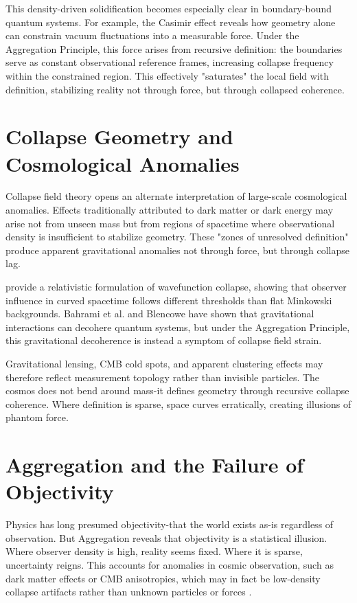 This density-driven solidification becomes especially clear in boundary-bound quantum systems. For example, the Casimir effect reveals how geometry alone can constrain vacuum fluctuations into a measurable force. 
Under the Aggregation Principle, this force arises from recursive definition: the boundaries serve as constant observational reference frames, increasing collapse frequency within the constrained region. 
This effectively "saturates" the local field with definition, stabilizing reality not through force, but through collapsed coherence.

\section{Collapse Geometry and Cosmological Anomalies}

Collapse field theory opens an alternate interpretation of large-scale cosmological anomalies. Effects traditionally attributed to dark matter or dark energy may arise not from unseen mass but from regions of spacetime where observational density is insufficient to stabilize geometry. 
These "zones of unresolved definition" produce apparent gravitational anomalies not through force, but through collapse lag.

\cite{aggregation_gravitational_collapse} provide a relativistic formulation of wavefunction collapse, showing that observer influence in curved spacetime follows different thresholds than flat Minkowski backgrounds. Bahrami et al. 
\cite{aggregation_decoherence_core} and Blencowe \cite{aggregation_decoherence_core} have shown that gravitational interactions can decohere quantum systems, but under the Aggregation Principle, this gravitational decoherence is instead a symptom of collapse field strain.

Gravitational lensing, CMB cold spots, and apparent clustering effects may therefore reflect measurement topology rather than invisible particles. 
The cosmos does not bend around mass-it defines geometry through recursive collapse coherence. Where definition is sparse, space curves erratically, creating illusions of phantom force.


\section{Aggregation and the Failure of Objectivity}

Physics has long presumed objectivity-that the world exists as-is regardless of observation. 
But Aggregation reveals that objectivity is a statistical illusion. Where observer density is high, reality seems fixed. Where it is sparse, uncertainty reigns.
This accounts for anomalies in cosmic observation, such as dark matter effects or CMB anisotropies, which may in fact be low-density collapse artifacts rather than unknown particles or forces \cite{aggregation_decoherence_core}.

